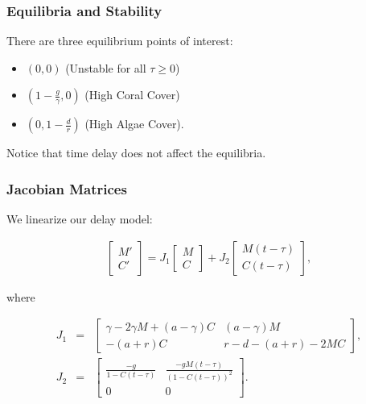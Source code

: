 \begin{frame}
\frametitle{Equilibria and Stability}
There are three equilibrium points of interest: 
\begin{itemize}
\item $(0,0)$ (Unstable for all $\tau\geq0$)\\
\item $(1-\frac{g}{\gamma},0)$ (High Coral Cover)\\
\item $(0,1-\frac{d}{r})$ (High Algae Cover).
\end{itemize} 
Notice that time delay does not affect the equilibria.
\end{frame}


\begin{frame}\frametitle{Jacobian Matrices}
We linearize our delay model:

\begin{eqnarray}
  \label{eqn:linearizedDelayModel}
  \begin{bmatrix} 
    M'\\C'
  \end{bmatrix}=J_1
  \begin{bmatrix} 
    M \\
    C
  \end{bmatrix} + 
  J_2
  \begin{bmatrix}
    M(t-\tau) \\
    C(t-\tau)
  \end{bmatrix},
\end{eqnarray}

where 

\begin{eqnarray*}
  J_1 & = & \begin{bmatrix}
    \gamma-2\gamma M +(a-\gamma)C & (a-\gamma)M\\
    -(a+r)C & r-d-(a+r)-2MC 
  \end{bmatrix},  \\
  J_2 & = & 
  \begin{bmatrix} 
    \frac{-g}{1-C(t-\tau)} & \frac{-gM(t-\tau)}{(1-C(t-\tau))^2} \\ 
    0 & 0
  \end{bmatrix}.
\end{eqnarray*}

\end{frame}

